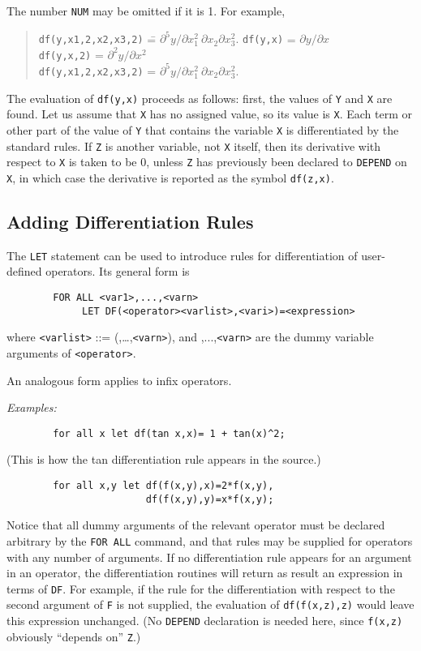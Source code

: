 The number {\tt NUM} may be omitted if it is 1.  For example,
\begin{quote}
\begin{tabbing}
{\tt            df(y,x1,2,x2,x3,2)} \= = $\partial^{5}y/\partial x_{1}^{2} \
 \partial x_{2}\partial x_{3}^{2}.$\kill
{\tt            df(y,x)} \> = $\partial y/\partial x$ \\
{\tt            df(y,x,2)} \> = $\partial^{2}y/\partial x^{2}$ \\
{\tt            df(y,x1,2,x2,x3,2)} \> = $\partial^{5}y/\partial x_{1}^{2} \
 \partial x_{2}\partial x_{3}^{2}.$
\end{tabbing}
\end{quote}
The evaluation of {\tt df(y,x)} proceeds as follows: first, the values of
{\tt Y} and {\tt X} are found.  Let us assume that {\tt X} has no assigned
value, so its value is {\tt X}.  Each term or other part of the value of
{\tt Y} that contains the variable {\tt X} is differentiated by the
standard rules.  If {\tt Z} is another variable, not {\tt X} itself, then
its derivative with respect to {\tt X} is taken to be 0, unless {\tt Z}
has previously been declared to {\tt DEPEND} on {\tt X}, in which
case the derivative is reported as the symbol {\tt df(z,x)}.


\subsection{Adding Differentiation Rules}

The {\tt LET} statement can be used to introduce
rules for differentiation of user-defined operators.  Its general form is
\begin{verbatim}
        FOR ALL <var1>,...,<varn>
             LET DF(<operator><varlist>,<vari>)=<expression>
\end{verbatim}
where {\tt <varlist>} ::= ({\tt <var1>},\dots,{\tt <varn>}), and
{\tt <var1>},...,{\tt <varn>} are the dummy variable arguments of
{\tt <operator>}.

An analogous form applies to infix operators.

{\it Examples:}
\begin{verbatim}
        for all x let df(tan x,x)= 1 + tan(x)^2;
\end{verbatim}
(This is how the tan differentiation rule appears in the {\REDUCE}
source.)
\begin{verbatim}
        for all x,y let df(f(x,y),x)=2*f(x,y),
                        df(f(x,y),y)=x*f(x,y);
\end{verbatim}
Notice that all dummy arguments of the relevant operator must be declared
arbitrary by the {\tt FOR ALL} command, and that rules may be supplied for
operators with any number of arguments.  If no differentiation rule
appears for an argument in an operator, the differentiation routines will
return as result an expression in terms of {\tt DF}\ttindex{DF}.  For
example, if the rule for the differentiation with respect to the second
argument of {\tt F} is not supplied, the evaluation of {\tt df(f(x,z),z)}
would leave this expression unchanged. (No {\tt DEPEND} declaration
is needed here, since {\tt f(x,z)} obviously ``depends on'' {\tt Z}.)

